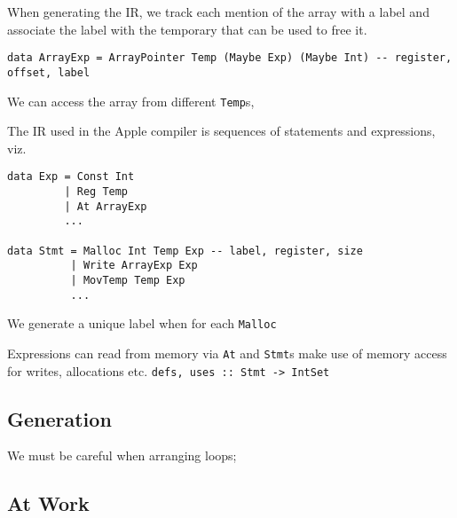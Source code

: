 \documentclass{article}
\begin{document}
When generating the IR, we track each mention of the array with a label and associate the label with the temporary that can be used to free it.

\begin{verbatim}
data ArrayExp = ArrayPointer Temp (Maybe Exp) (Maybe Int) -- register, offset, label
\end{verbatim}

We can access the array from different {\tt Temp}s,




The IR used in the Apple compiler is sequences of statements and expressions, viz.

\begin{verbatim}
data Exp = Const Int
         | Reg Temp
         | At ArrayExp
         ...

data Stmt = Malloc Int Temp Exp -- label, register, size
          | Write ArrayExp Exp
          | MovTemp Temp Exp
          ...
\end{verbatim}

We generate a unique label when for each {\tt Malloc}

Expressions can read from memory via {\tt At} and {\tt Stmt}s make use of memory access for writes, allocations etc. {\tt defs, uses :: Stmt -> IntSet}

\subsection{Generation}

We must be careful when arranging loops;

\subsection{At Work}
\end{document}
